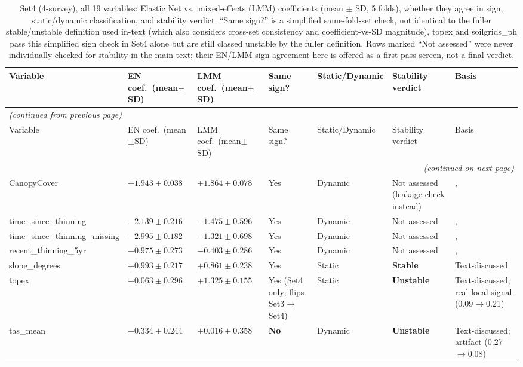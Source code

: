 \documentclass[logo,msc,ai]{infthesis}           %
\begin{document}
{\scriptsize
\setlength{\tabcolsep}{2pt}
\renewcommand{\arraystretch}{1.05}
\begin{longtable}{p{2.6cm}p{1.5cm}p{1.5cm}p{1.3cm}p{1.7cm}p{1.6cm}p{2.6cm}}
\caption{\small{Set4 (4-survey), all 19 variables: Elastic Net vs.\ mixed-effects (LMM) coefficients (mean $\pm$ SD, 5 folds), whether they agree in sign, static/dynamic classification, and stability verdict. ``Same sign?'' is a simplified same-fold-set check, not identical to the fuller stable/unstable definition used in-text (which also considers cross-set consistency and coefficient-vs-SD magnitude), topex and soilgrids\_ph pass this simplified sign check in Set4 alone but are still classed unstable by the fuller definition. Rows marked ``Not assessed'' were never individually checked for stability in the main text; their EN/LMM sign agreement here is offered as a first-pass screen, not a final verdict.}}
\label{tab:q1-set4-full-variable-table} \\
\toprule
Variable & EN coef.\ (mean$\pm$SD) & LMM coef.\ (mean$\pm$SD) & Same sign? & Static/Dynamic & Stability verdict & Basis \\
\midrule
\endfirsthead
\multicolumn{7}{l}{\normalfont\itshape (continued from previous page)} \\
\toprule
Variable & EN coef.\ (mean$\pm$SD) & LMM coef.\ (mean$\pm$SD) & Same sign? & Static/Dynamic & Stability verdict & Basis \\
\midrule
\endhead
\bottomrule
\multicolumn{7}{r}{\normalfont\itshape (continued on next page)} \\
\endfoot
\bottomrule
\endlastfoot
CanopyCover & $+1.943\pm0.038$ & $+1.864\pm0.078$ & Yes & Dynamic & Not assessed (leakage check instead) &, \\
time\_since\_thinning & $-2.139\pm0.216$ & $-1.475\pm0.596$ & Yes & Dynamic & Not assessed &, \\
time\_since\_thinning\_missing & $-2.995\pm0.182$ & $-1.321\pm0.698$ & Yes & Dynamic & Not assessed &, \\
recent\_thinning\_5yr & $-0.975\pm0.273$ & $-0.403\pm0.286$ & Yes & Dynamic & Not assessed &, \\
slope\_degrees & $+0.993\pm0.217$ & $+0.861\pm0.238$ & Yes & Static & \textbf{Stable} & Text-discussed \\
topex & $+0.063\pm0.296$ & $+1.325\pm0.155$ & Yes (Set4 only; flips Set3$\to$Set4) & Static & \textbf{Unstable} & Text-discussed; real local signal (0.09$\to$0.21) \\
tas\_mean & $-0.334\pm0.244$ & $+0.016\pm0.358$ & \textbf{No} & Dynamic & \textbf{Unstable} & Text-discussed; artifact (0.27$\to$0.08) \\

\end{longtable}}
\end{document}
